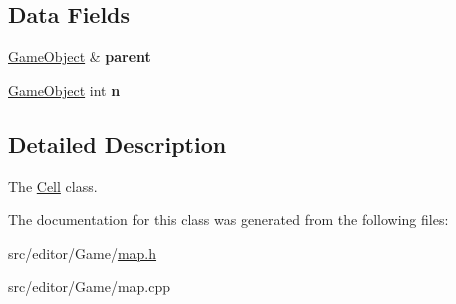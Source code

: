 \subsection*{\-Data \-Fields}
\begin{DoxyCompactItemize}
\item 
\hypertarget{class_cell_a00ea67e68bfb838eb46da7309a5cb56e}{\hyperlink{class_game_object}{\-Game\-Object} \& {\bfseries parent}}\label{class_cell_a00ea67e68bfb838eb46da7309a5cb56e}

\item 
\hypertarget{class_cell_ad2e41db325c0c70d969c98a3f90776a2}{\hyperlink{class_game_object}{\-Game\-Object} int {\bfseries n}}\label{class_cell_ad2e41db325c0c70d969c98a3f90776a2}

\end{DoxyCompactItemize}


\subsection{\-Detailed \-Description}
\-The \hyperlink{class_cell}{\-Cell} class. 

\-The documentation for this class was generated from the following files\-:\begin{DoxyCompactItemize}
\item 
src/editor/\-Game/\hyperlink{map_8h}{map.\-h}\item 
src/editor/\-Game/map.\-cpp\end{DoxyCompactItemize}
